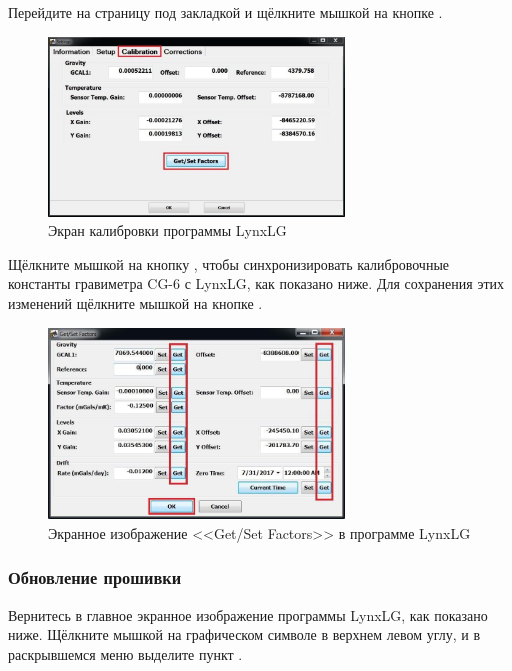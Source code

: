 Перейдите на страницу под закладкой  и щёлкните мышкой на кнопке
.

\begin{figure}[H]
  \centering
  \includegraphics[width=0.7\textwidth]{figures/the_lynxlg_software_calibration_screen}
  \caption{Экран калибровки программы LynxLG}
  \label{fig:the_lynxlg_software_calibration_screen}
\end{figure}

Щёлкните мышкой на кнопку , чтобы синхронизировать калибровочные
константы гравиметра CG-6 с LynxLG, как показано ниже. Для сохранения этих
изменений щёлкните мышкой на кнопке .

\begin{figure}[H]
  \centering
  \includegraphics[width=0.7\textwidth]{figures/the_lynxlg_software_get_set_factors_screen}
  \caption{Экранное изображение <<Get/Set Factors>> в программе LynxLG}
  \label{fig:the_lynxlg_software_get_set_factors_screen}
\end{figure}

\subsubsection{Обновление прошивки}
\label{subsubsec:update_firmware}

Вернитесь в главное экранное изображение программы LynxLG, как показано ниже.
Щёлкните мышкой на графическом символе  в верхнем левом углу, и в
раскрывшемся меню выделите пункт .

